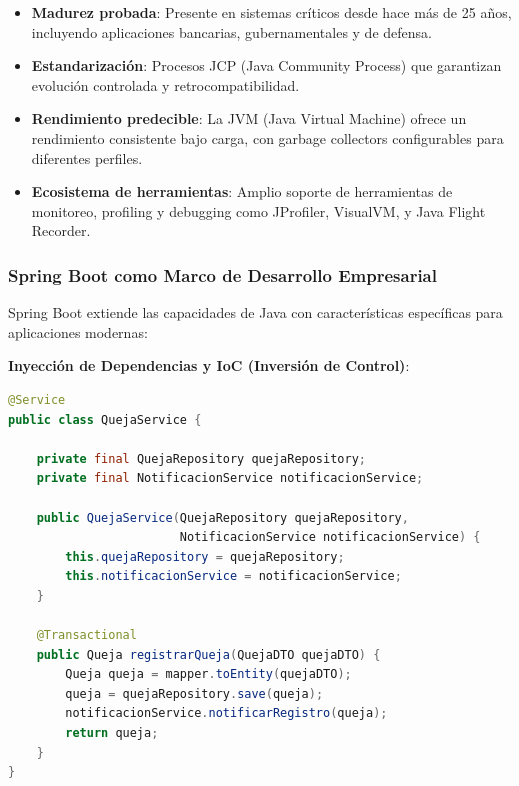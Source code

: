 \begin{itemize}
    \item \textbf{Madurez probada}: Presente en sistemas críticos desde hace más de 25 años, incluyendo aplicaciones bancarias, gubernamentales y de defensa.
    
    \item \textbf{Estandarización}: Procesos JCP (Java Community Process) que garantizan evolución controlada y retrocompatibilidad.
    
    \item \textbf{Rendimiento predecible}: La JVM (Java Virtual Machine) ofrece un rendimiento consistente bajo carga, con garbage collectors configurables para diferentes perfiles.
    
    \item \textbf{Ecosistema de herramientas}: Amplio soporte de herramientas de monitoreo, profiling y debugging como JProfiler, VisualVM, y Java Flight Recorder.
\end{itemize}

\subsubsection{Spring Boot como Marco de Desarrollo Empresarial}

Spring Boot extiende las capacidades de Java con características específicas para aplicaciones modernas:

\textbf{Inyección de Dependencias y IoC (Inversión de Control)}:

\begin{lstlisting}[language=Java, caption=Ejemplo de inyección de dependencias en Spring Boot]
@Service
public class QuejaService {
    
    private final QuejaRepository quejaRepository;
    private final NotificacionService notificacionService;
    
    public QuejaService(QuejaRepository quejaRepository, 
                        NotificacionService notificacionService) {
        this.quejaRepository = quejaRepository;
        this.notificacionService = notificacionService;
    }
    
    @Transactional
    public Queja registrarQueja(QuejaDTO quejaDTO) {
        Queja queja = mapper.toEntity(quejaDTO);
        queja = quejaRepository.save(queja);
        notificacionService.notificarRegistro(queja);
        return queja;
    }
}
\end{lstlisting}

